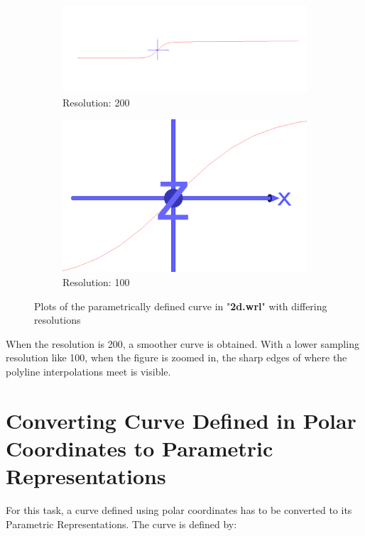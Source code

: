 \documentclass[acmlarge,nonacm=true]{acmart}
\begin{document}
\begin{figure}[H]
	\begin{subfigure}{.4\textwidth}
	  \centering
	  \includegraphics[width=.8\linewidth]{fig/2_200}
	  \caption{Resolution: 200}
	\end{subfigure}%
	\begin{subfigure}{.4\textwidth}
	  \centering
	  \includegraphics[width=.8\linewidth]{fig/2_100}
	  \caption{Resolution: 100}
	\end{subfigure}
	\caption{Plots of the parametrically defined curve in "\textbf{2d.wrl}" with differing resolutions}
	\label{fig:2}
\end{figure}

When the resolution is 200, a smoother curve is obtained. With a lower sampling resolution like 100, when the 
figure is zoomed in, the sharp edges of where the polyline interpolations meet is visible.

\pagebreak
\section{Converting Curve Defined in Polar Coordinates to Parametric Representations}
For this task, a curve defined using polar coordinates has to be converted to its Parametric Representations. 
The curve is defined by:
\end{document}
